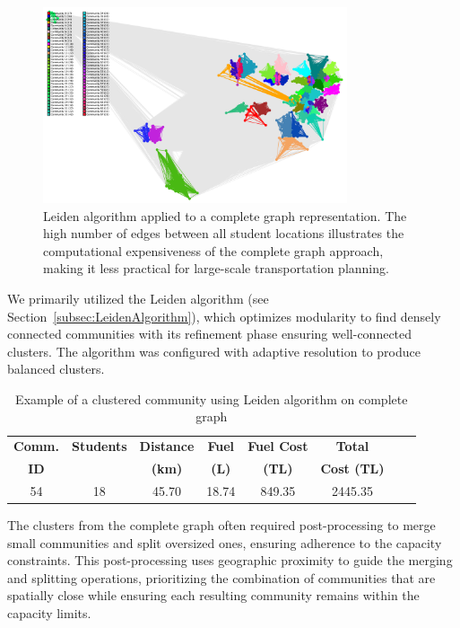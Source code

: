 \begin{figure}[!htbp]
\centering
\includegraphics[width=0.8\textwidth]{img/leiden_complete2}
\caption{Leiden algorithm applied to a complete graph representation. The high number of edges between all student locations illustrates the computational expensiveness of the complete graph approach, making it less practical for large-scale transportation planning.}
\label{fig:leiden_complete}
\end{figure}

We primarily utilized the Leiden algorithm (see Section~\ref{subsec:LeidenAlgorithm}), which optimizes modularity to find densely connected communities with its refinement phase ensuring well-connected clusters. The algorithm was configured with adaptive resolution to produce balanced clusters.

\begin{table}[h]
\centering

\label{tab:leiden_complete_example}
\begin{tabular}{|c|c|c|c|c|c|c|c|}
\hline
\textbf{Comm.} & \textbf{Students}  &  \textbf{Distance} & \textbf{Fuel} & \textbf{Fuel Cost} & \textbf{Total} \\
\textbf{ID} & & \textbf{(km)} & \textbf{(L)} & \textbf{(TL)} & \textbf{Cost (TL)} \\
\hline
54 & 18  & 45.70 & 18.74 & 849.35 & 2445.35 \\
\hline
\end{tabular}
\caption{Example of a clustered community using Leiden algorithm on complete graph}
\end{table}

The clusters from the complete graph often required post-processing to merge small communities and split oversized ones, ensuring adherence to the capacity constraints. This post-processing uses geographic proximity to guide the merging and splitting operations, prioritizing the combination of communities that are spatially close while ensuring each resulting community remains within the capacity limits.

